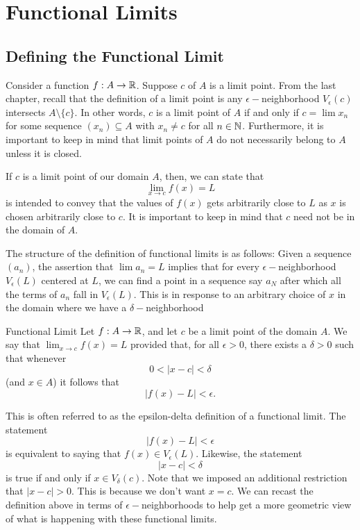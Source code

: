 \section{Functional Limits}


\subsection{Defining the Functional Limit}
Consider a function \( f: A \to \mathbb{R}  \). Suppose \( c  \) of \( A  \) is a limit point. From the last chapter, recall that the definition of a limit point is any \( \epsilon - \)neighborhood \( V_{\epsilon }(c) \) intersects \( A \setminus \{ c \}  \). In other words, \( c  \) is a limit point of \(  A \) if and only if \( c = \lim x_n \) for some sequence \( (x_n) \subseteq A  \) with \( x_n \neq c  \) for all \( n \in \mathbb{N}  \). Furthermore, it is important to keep in mind that limit points of \(  A \) do not necessarily belong to \( A  \) unless it is closed. 

If \( c  \) is a limit point of our domain \( A  \), then, we can state that 
\[ \lim_{x \to c }f(x) = L  \] is intended to convey that the values of \( f(x) \) gets arbitrarily close to \( L \) as \( x  \) is chosen arbitrarily close to \( c \). It is important to keep in mind that \( c \) need not be in the domain of \( A  \).

The structure of the definition of functional limits is as follows:
Given a sequence \( (a_n) \), the assertion that \( \lim a_n = L   \) implies that for every \( \epsilon - \)neighborhood \( V_{\epsilon }(L) \) centered at \( L \), we can find a point in a sequence say \( a_N \) after which all the terms of \( a_n \) fall in \( V_{\epsilon }(L) \). This is in response to an arbitrary choice of \( x \) in the domain where we have a \( \delta- \)neighborhood

\begin{definition}{Functional Limit}{}
        Let \( f: A \to \mathbb{R}  \), and let \( c \) be a limit point of the domain \( A  \). We say that \( \lim_{ x \to c } f(x) = L   \) provided that, for all \( \epsilon > 0  \), there exists a \( \delta > 0  \) such that whenever 
        \[ 0 <  | x - c  | < \delta  \] (and \( x \in A  \)) it follows that 
        \[ | f(x) - L  | < \epsilon.  \]
    \end{definition}

This is often referred to as the epsilon-delta definition of a functional limit. The statement
\[ | f(x) - L  | < \epsilon  \]
is equivalent to saying that \( f(x) \in V_{\epsilon }(L) \). Likewise, the statement 
\[  | x - c  | < \delta \] is true if and only if \( x \in V_{\delta}(c) \). Note that we imposed an additional restriction that \( | x - c  | > 0  \). This is because we don't want \( x = c  \). We can recast the definition above in terms of \( \epsilon- \)neighborhoods to help get a more geometric view of what is happening with these functional limits.

